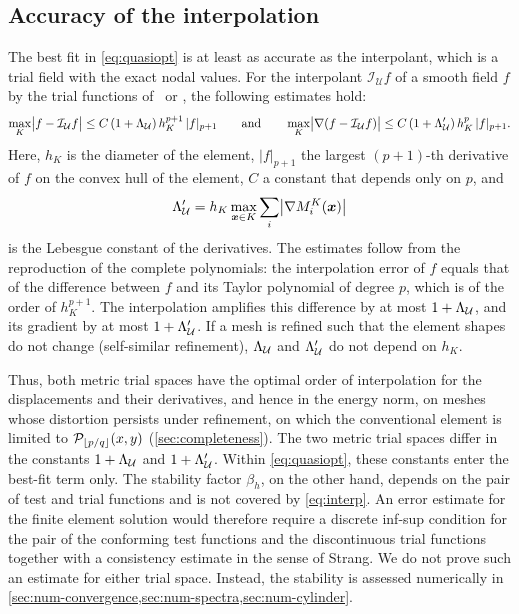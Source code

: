 \subsection{Accuracy of the interpolation}
\label{sec:hybrid-approximation}
%
The best fit in \cref{eq:quasiopt} is at least as accurate as the interpolant, which is a trial field with the exact nodal values. For the interpolant $\mathcal I_{\mathcal U}f$ of a smooth field $f$ by the trial functions of \PM\ or \PH, the following estimates hold:
%
\begin{equation}
  \max_{K}\bigl|f-\mathcal I_{\mathcal U}f\bigr|\le C\,(1+\Lambda_{\mathcal U})\,h_K^{p+1}\,|f|_{p+1}
  \qquad\text{and}\qquad
  \max_{K}\bigl|\nabla(f-\mathcal I_{\mathcal U}f)\bigr|\le C\,(1+\Lambda'_{\mathcal U})\,h_K^{p}\,|f|_{p+1} .
  \label{eq:interp}
\end{equation}
%
Here, $h_K$ is the diameter of the element, $|f|_{p+1}$ the largest $(p+1)$-th derivative of $f$ on the convex hull of the element, $C$ a constant that depends only on $p$, and
%
\begin{equation}
  \Lambda'_{\mathcal U}=h_K\max_{\bm{x}\in K}\sum\limits_{i}\bigl|\nabla M_i^K(\bm{x})\bigr|
  \label{eq:lebesgue1}
\end{equation}
%
is the Lebesgue constant of the derivatives. The estimates follow from the reproduction of the complete polynomials: the interpolation error of $f$ equals that of the difference between $f$ and its Taylor polynomial of degree $p$, which is of the order of $h_K^{p+1}$. The interpolation amplifies this difference by at most $1+\Lambda_{\mathcal U}$, and its gradient by at most $1+\Lambda'_{\mathcal U}$. If a mesh is refined such that the element shapes do not change (self-similar refinement), $\Lambda_{\mathcal U}$ and $\Lambda'_{\mathcal U}$ do not depend on $h_K$.

Thus, both metric trial spaces have the optimal order of interpolation for the displacements and their derivatives, and hence in the energy norm, on meshes whose distortion persists under refinement, on which the conventional element is limited to $\mathcal P_{\lfloor p/q\rfloor}(x,y)$ (\cref{sec:completeness}). The two metric trial spaces differ in the constants $1+\Lambda_{\mathcal U}$ and $1+\Lambda'_{\mathcal U}$. Within \cref{eq:quasiopt}, these constants enter the best-fit term only. The stability factor $\beta_h$, on the other hand, depends on the pair of test and trial functions and is not covered by \cref{eq:interp}. An error estimate for the finite element solution would therefore require a discrete inf-sup condition for the pair of the conforming test functions and the discontinuous trial functions together with a consistency estimate in the sense of Strang. We do not prove such an estimate for either trial space. Instead, the stability is assessed numerically in \cref{sec:num-convergence,sec:num-spectra,sec:num-cylinder}.
%
